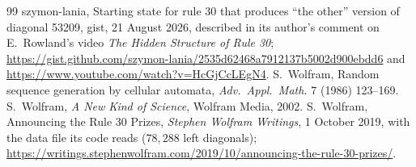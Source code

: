 \documentclass[11pt]{article}
\theoremstyle{definition}
\theoremstyle{remark}
\begin{document}
\begin{thebibliography}{99}
 szymon-lania, Starting state for rule 30 that produces ``the other'' version of diagonal 53209, gist, 21 August 2026, described in its author's comment on E.~Rowland's video \emph{The Hidden Structure of Rule 30}; \url{https://gist.github.com/szymon-lania/2535d62468a7912137b5002d900ebdd6} and \url{https://www.youtube.com/watch?v=HcGjCcLEgN4}.
 S.~Wolfram, Random sequence generation by cellular automata, \emph{Adv.\ Appl.\ Math.} 7 (1986) 123--169.
 S.~Wolfram, \emph{A New Kind of Science}, Wolfram Media, 2002.
 S.~Wolfram, Announcing the Rule 30 Prizes, \emph{Stephen Wolfram Writings}, 1 October 2019, with the data file its code reads ($78{,}288$ left diagonals); \url{https://writings.stephenwolfram.com/2019/10/announcing-the-rule-30-prizes/}.
\end{thebibliography}
\end{document}
